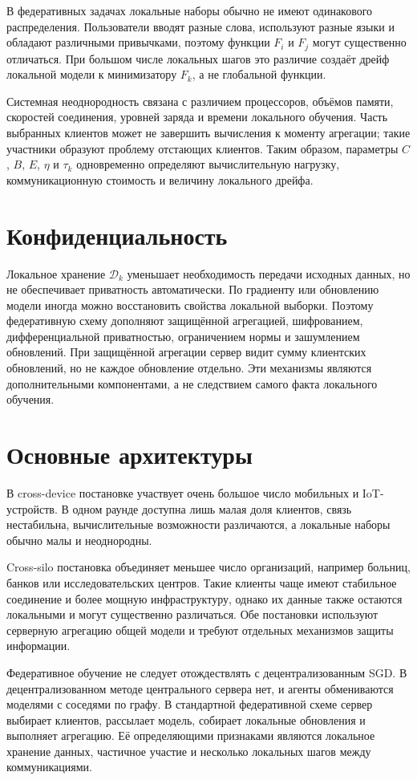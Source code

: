 В федеративных задачах локальные наборы обычно не имеют одинакового
распределения. Пользователи вводят разные слова, используют разные
языки и обладают различными привычками, поэтому функции \(F_i\) и
\(F_j\) могут существенно отличаться. При большом числе локальных
шагов это различие создаёт дрейф локальной модели к минимизатору
\(F_k\), а не глобальной функции.

Системная неоднородность связана с различием процессоров, объёмов
памяти, скоростей соединения, уровней заряда и времени локального
обучения. Часть выбранных клиентов может не завершить вычисления к
моменту агрегации; такие участники образуют проблему отстающих
клиентов. Таким образом, параметры \(C\), \(B\), \(E\), \(\eta\) и
\(\tau_k\) одновременно определяют вычислительную нагрузку,
коммуникационную стоимость и величину локального дрейфа.

\section{Конфиденциальность}

Локальное хранение \(\mathcal D_k\) уменьшает необходимость передачи
исходных данных, но не обеспечивает приватность автоматически. По
градиенту или обновлению модели иногда можно восстановить свойства
локальной выборки. Поэтому федеративную схему дополняют защищённой
агрегацией, шифрованием, дифференциальной приватностью, ограничением
нормы и зашумлением обновлений. При защищённой агрегации сервер видит
сумму клиентских обновлений, но не каждое обновление отдельно. Эти
механизмы являются дополнительными компонентами, а не следствием
самого факта локального обучения.

\section{Основные архитектуры}

В cross-device постановке участвует очень большое число мобильных и
IoT-устройств. В одном раунде доступна лишь малая доля клиентов, связь
нестабильна, вычислительные возможности различаются, а локальные
наборы обычно малы и неоднородны.

Cross-silo постановка объединяет меньшее число организаций, например
больниц, банков или исследовательских центров. Такие клиенты чаще
имеют стабильное соединение и более мощную инфраструктуру, однако их
данные также остаются локальными и могут существенно различаться.
Обе постановки используют серверную агрегацию общей модели и требуют
отдельных механизмов защиты информации.

Федеративное обучение не следует отождествлять с децентрализованным
SGD. В децентрализованном методе центрального сервера нет, и агенты
обмениваются моделями с соседями по графу. В стандартной федеративной
схеме сервер выбирает клиентов, рассылает модель, собирает локальные
обновления и выполняет агрегацию. Её определяющими признаками являются
локальное хранение данных, частичное участие и несколько локальных
шагов между коммуникациями.
